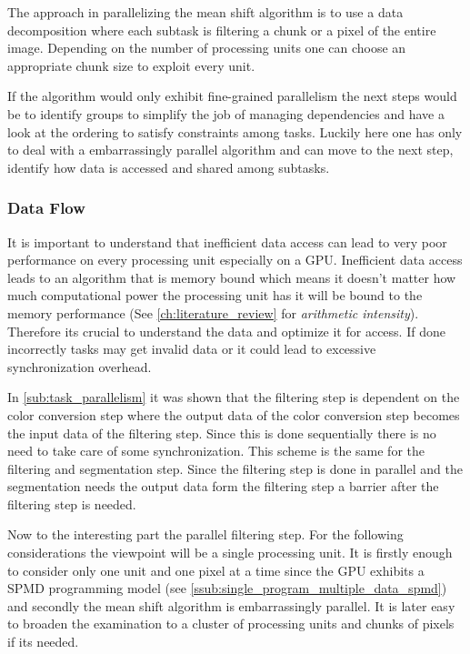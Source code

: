 The approach in parallelizing the mean shift algorithm is to use a data
decomposition where each subtask is filtering a chunk or a pixel of the entire
image. Depending on the number of processing units one can choose an appropriate
chunk size to exploit every unit.

If the algorithm would only exhibit fine-grained parallelism the next steps would
be to identify groups to simplify the job of managing dependencies and have a 
look at the ordering to satisfy constraints among tasks. Luckily here one has only
to deal with a embarrassingly parallel algorithm and can move to the next step, 
identify how data is accessed and shared among subtasks. 

\subsubsection{Data Flow} %
\label{ssub:data_flow}

It is important to understand that inefficient data access can lead to very poor
performance on every processing unit especially on a \gls{GPU}. Inefficient data
access leads to an algorithm that is memory bound which means it doesn't matter
how much computational power the processing unit has it will be bound to the
memory performance (See \autoref{ch:literature_review} for \emph{arithmetic
intensity}). Therefore its crucial to understand the data and optimize it for
access. If done incorrectly tasks may get invalid data or it could lead to
excessive synchronization overhead. 

In \autoref{sub:task_parallelism} it was shown that the filtering step is
dependent on the color conversion step where the output data of the color
conversion step becomes the input data of the filtering step. Since this is done
sequentially there is no need to take care of some synchronization. This scheme
is the same for the filtering and segmentation step. Since the filtering step is
done in parallel and the segmentation needs the output data form the filtering
step a barrier after the filtering step is needed. 

Now to the interesting part the parallel filtering step. For the following
considerations the viewpoint will be a single processing unit. It is firstly
enough to consider only one unit and one pixel at a time since the \gls{GPU}
exhibits a \gls{SPMD} programming model (see
\autoref{ssub:single_program_multiple_data_spmd}) and secondly the mean shift
algorithm is embarrassingly parallel. It is later easy to broaden the
examination to a cluster of processing units and chunks of pixels if its needed. 

